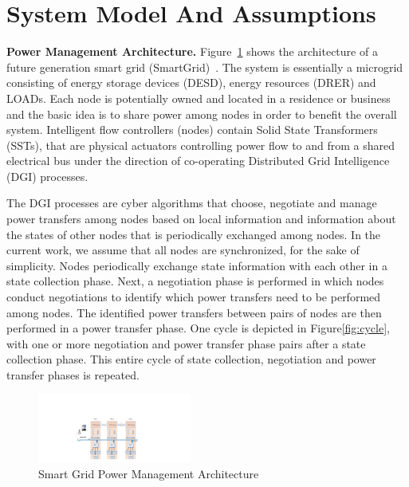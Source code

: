 \section{System Model And Assumptions}
\label{sec:assumptions}

{\bf Power Management Architecture.} Figure~\ref{fig:SmartGridArchi-fig} shows
the architecture of a future generation smart grid (SmartGrid)~\cite{huang11}.
The system is essentially a microgrid consisting of energy storage devices
(DESD), energy resources (DRER) and LOADs. Each node is potentially owned and
located in a residence or business and the basic idea is to share power among
nodes in order to benefit the overall system. Intelligent flow controllers
(nodes) contain Solid State Transformers (SSTs), that are physical actuators
controlling power flow to and from a shared electrical bus under the direction
of co-operating Distributed Grid Intelligence (DGI) processes.

The DGI processes are cyber algorithms that choose, negotiate and manage power
transfers among nodes based on local information and information about the
states of other nodes that is periodically exchanged among nodes. In the current
work, we assume that all nodes are synchronized, for the sake of simplicity.
Nodes periodically exchange state information with each other in a state
collection phase. Next, a negotiation phase is performed in which nodes conduct
negotiations to identify which power transfers need to be performed among nodes.
The identified power transfers between pairs of nodes are then performed in a
power transfer phase. One cycle is depicted in Figure\ref{fig:cycle}, with one
or more negotiation and power transfer phase pairs after a state collection
phase. This entire cycle of state collection, negotiation and power transfer
phases is repeated.

\begin{figure}[htb]
  \begin{center}
    \includegraphics[width=0.45\textwidth]{Figures/DistributedLoadBalancing3.pdf}
  \caption{Smart Grid Power Management Architecture}
  \label{fig:SmartGridArchi-fig}
  \end{center}
\end{figure}

